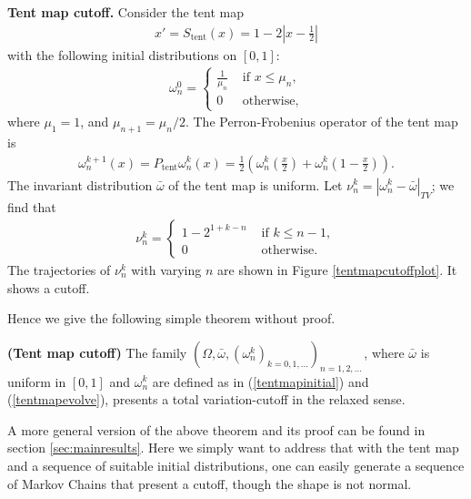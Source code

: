 \begin{example} \textbf{Tent map cutoff.}
Consider the tent map
   \begin{eqnarray}
   \label{tentmap}
     x' = S_\text{tent}(x) = 1-2\left|x-\frac{1}{2}\right|
   \end{eqnarray}
with the following initial distributions on $[0 ,1]$:
  \begin{eqnarray}
  \label{tentmapinitial}
    \omega_n^0 = \begin{cases}
                      \frac{1}{\mu_n} &\text{ if } x \le \mu_n,\\
                      0               &\text{ otherwise},
                      \end{cases}
  \end{eqnarray}
where $\mu_1 = 1$, and $\mu_{n+1} = \mu_n/2$. The Perron-Frobenius operator of the tent map is
  \begin{eqnarray}
  \label{tentmapevolve}
    \omega_n^{k+1}(x) = P_\text{tent} \omega_n^{k}(x)
                             = \frac{1}{2}\left( \omega_n^{k}\left(\frac{x}{2}\right)+
                                                 \omega_n^{k}\left(1-\frac{x}{2}\right)  \right).
  \end{eqnarray}
The invariant distribution $\bar{\omega}$ of the tent map is uniform. Let $\nu_n^k =
|\omega_n^k-\bar{\omega} |_{TV}$; we find that
 \begin{eqnarray}
   \nu_n^k =  \begin{cases}
                    1- 2^{1+k-n}  &\text{ if }k \le n-1, \\
                    0             &\text{ otherwise}.
              \end{cases}
 \end{eqnarray}
The trajectories of $\nu_n^k$ with varying $n$ are shown in Figure \ref{tentmapcutoffplot}. It shows a cutoff.
\end{example}
Hence we give the following simple theorem without proof.
\begin{theorem} \textbf{(Tent map cutoff)}
\label{tentmapcutoff}
The family $(\Omega,\bar{\omega}, (\omega^k_n)_{k=0,1,\ldots})_{n=1,2,\ldots\,}$, where $\bar{\omega}$ is
uniform in $[0,1]$ and $\omega^k_n$ are defined as in (\ref{tentmapinitial}) and
(\ref{tentmapevolve}), presents a total variation-cutoff in the relaxed sense.
\end{theorem}
A more general version of the above theorem and its proof can be found in section \ref{sec:mainresults}. Here we simply want to address that with the tent map and a sequence of suitable initial distributions, one can easily generate a sequence of Markov Chains that present a cutoff, though the shape is not normal.

